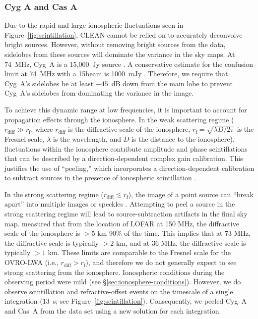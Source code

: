 \begin{bibunit}
\subsubsection{Cyg A and Cas A}

Due to the rapid and large ionospheric fluctuations seen in Figure~\ref{fig:scintillation}, CLEAN
cannot be relied on to accurately deconvolve bright sources.  However, without removing bright
sources from the data, sidelobes from these sources will dominate the variance in the sky maps.  At
74~MHz, Cyg~A is a 15,000~Jy source \citep{1977A&A....61...99B}. A conservative estimate for the
confusion limit at 74~MHz with a 15\arcmin beam is 1000~mJy \citep{2014MNRAS.440..327L}. Therefore,
we require that Cyg~A's sidelobes be at least $-45$~dB down from the main lobe to prevent Cyg~A's
sidelobes from dominating the variance in the image.

To achieve this dynamic range at low frequencies, it is important to account for propagation effects
through the ionosphere. In the weak scattering regime ($r_\text{diff} \gg r_\text{f}$, where
$r_\text{diff}$ is the diffractive scale of the ionosphere, $r_\text{f} = \sqrt{\lambda D / 2\pi}$
is the Fresnel scale, $\lambda$ is the wavelength, and $D$ is the distance to the ionosphere),
fluctuations within the ionosphere contribute amplitude and phase scintillations that can be
described by a direction-dependent complex gain calibration. This justifies the use of ``peeling,''
which incorporates a direction-dependent calibration to subtract sources in the presence of
ionospheric scintillation \citep[e.g.,][]{2008ISTSP...2..707M, 2015MNRAS.449.2668S}.

In the strong scattering regime ($r_\text{diff} \lesssim r_\text{f}$), the image of a point source
can ``break apart'' into multiple images or speckles \citep{2015MNRAS.453..925V}.  Attempting to
peel a source in the strong scattering regime will lead to source-subtraction artifacts in the final
sky map.  \citet{2016RaSc...51..927M} measured that from the location of LOFAR at 150 MHz, the
diffractive scale of the ionosphere is $>5$ km 90\% of the time. This implies that at 73 MHz, the
diffractive scale is typically $>2$ km, and at 36 MHz, the diffractive scale is typically $>1$ km.
These limits are comparable to the Fresnel scale for the OVRO-LWA (i.e., $r_\text{diff} >
r_\text{f}$), and therefore we do not generally expect to see strong scattering from the ionosphere.
Ionospheric conditions during the observing period were mild (see
\S\ref{sec:ionosphere-conditions}). However, we do observe scintillation and refractive-offset
events on the timescale of a single integration (13~s; see Figure~\ref{fig:scintillation}).
Consequently, we peeled Cyg~A and Cas~A from the data set using a new solution for each integration.


\end{bibunit}
